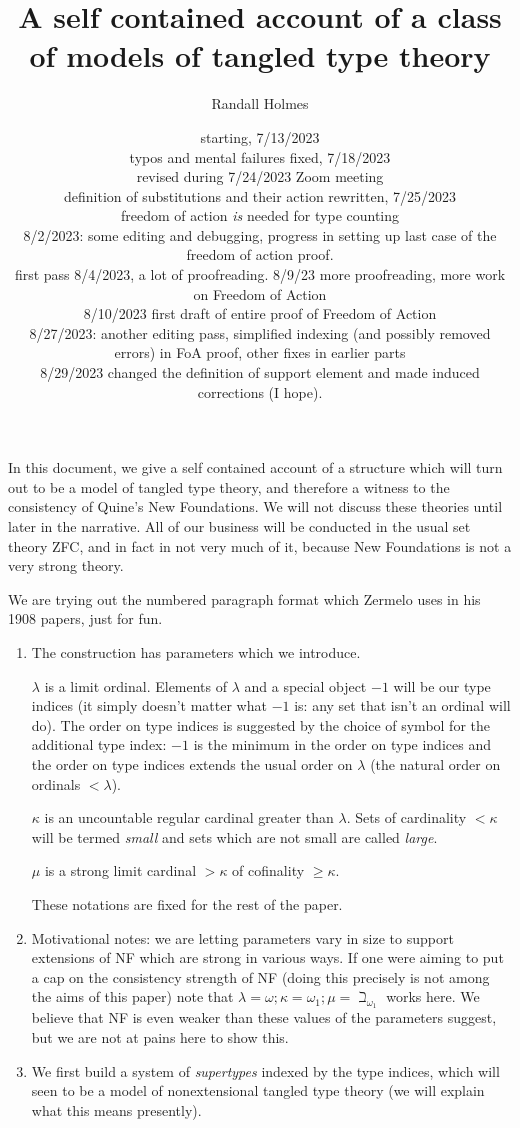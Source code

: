 \documentclass[12pt]{article}
\title{A self contained account of a class of models of tangled type theory}
\author{Randall Holmes}
\date{starting, 7/13/2023\\
typos and mental failures fixed, 7/18/2023\\
revised during 7/24/2023 Zoom meeting\\definition of substitutions and their action rewritten, 7/25/2023\\
freedom of action {\em is} needed for type counting\\
8/2/2023:  some editing and debugging, progress in setting up last case of the freedom of action proof.\\
first pass 8/4/2023, a lot of proofreading.
8/9/23 more proofreading, more work on Freedom of Action\\
8/10/2023 first draft of entire proof of Freedom of Action\\
8/27/2023:  another editing pass, simplified indexing (and possibly removed errors) in FoA proof, other fixes in earlier parts\\
8/29/2023 changed the definition of support element and made induced corrections (I hope).}
\begin{document}
\maketitle

\newpage

In this document, we give a self contained account of a structure which will turn out to be a model of tangled type theory, and therefore a witness to the consistency of Quine's New Foundations.
We will not discuss these theories until later in the narrative.  All of our business will be conducted in the usual set theory ZFC, and in fact in not very much of it, because New Foundations is not a very strong theory.

We are trying out the numbered paragraph format which Zermelo uses in his 1908 papers, just for fun.

\begin{enumerate}

\item The construction has parameters which we introduce.

$\lambda$ is a limit ordinal.  Elements of $\lambda$ and a special object $-1$ will be our type indices (it simply doesn't matter what $-1$ is:  any set that isn't an ordinal will do).  The order on type indices is suggested by the choice of symbol for the additional type index:  $-1$ is the minimum in the order on type indices and the order on type indices extends the usual order on $\lambda$ (the natural order on ordinals $<\lambda$).

$\kappa$ is an uncountable regular cardinal greater than $\lambda$.  Sets of cardinality $<\kappa$ will be termed {\em small\/} and sets which are not small are called {\em large\/}.

$\mu$ is a strong limit cardinal $>\kappa$ of cofinality $\geq \kappa$.

These notations are fixed for the rest of the paper.

\item  Motivational notes:  we are letting parameters vary in size to support extensions of NF which are strong in various ways.  If one were aiming to put a cap on the consistency strength of NF (doing this precisely is not among the aims of this paper) note that $\lambda = \omega; \kappa = \omega_1; \mu = \beth_{\omega_1}$ works here.  We believe that NF is even weaker than these values of the parameters suggest, but we are not at pains here to show this.

\item We first build a system of {\em supertypes\/} indexed by the type indices, which will seen to be a model of nonextensional tangled type theory (we will explain what this means presently).


\end{enumerate}
\end{document}
